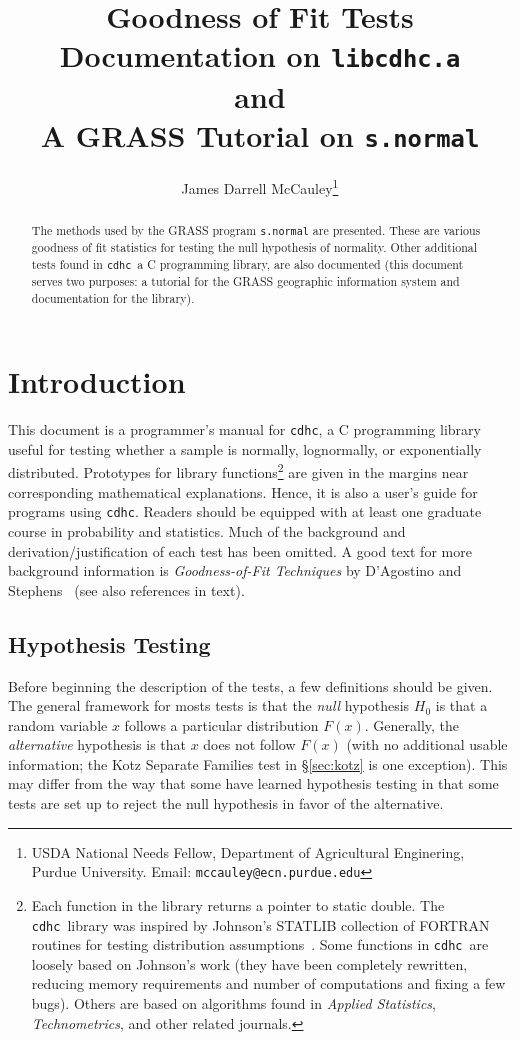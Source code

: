 \documentclass[draft]{article}
\title{Goodness of Fit Tests\\
{\large Documentation on {\tt libcdhc.a}}\\
{\large and}\\
{\large A GRASS Tutorial on {\tt s.normal}}}
\author{James Darrell McCauley\thanks{USDA National Needs Fellow,
Department of Agricultural Enginering, Purdue University. Email:
{\tt mccauley@ecn.purdue.edu}}}
\def\libname{{\tt cdhc}}
\begin{document}

\maketitle

\begin{abstract}
The methods used by the GRASS program {\tt s.normal}
are presented. These are various goodness of fit statistics for testing
the null hypothesis of normality. Other additional tests found in
\libname\, a C programming library,
are also documented (this document serves two purposes:
a tutorial for the GRASS geographic information system
and documentation for the library).
\end{abstract}

\section{Introduction}

This document is a programmer's
manual for \libname, a C programming library useful
for testing whether a sample is normally, lognormally,
or exponentially distributed.
Prototypes for library functions\footnote{%
Each function in the library returns a pointer to static double.
The \libname\ library was inspired by Johnson's
STATLIB collection of FORTRAN routines for testing
distribution assumptions~\protect\cite{johnson94}.
Some functions in \libname\
are loosely based on Johnson's work (they have been completely
rewritten, reducing memory requirements and number
of computations and fixing a few bugs). Others are based on
algorithms found in \emph{Applied Statistics}, \emph{Technometrics},
and other related journals.}
are given in the margins near
corresponding mathematical explanations. Hence, it is also
a user's guide for programs using \libname.
Readers should be equipped with at least one graduate course
in probability and statistics. Much of the background
and derivation/justification of each test has been
omitted. A good text for more background information
is {\em Goodness-of-Fit Techniques\/} by
D'Agostino and Stephens~\cite{dagostino86b} (see also references in text).

\subsection{Hypothesis Testing}

Before beginning the description of the tests, a few definitions
should be given. The general framework for mosts tests is that
the {\em null\/} hypothesis \(H_0\) is that a random variable \(x\)
follows a particular distribution \(F\left(x\right)\).
Generally, the {\em alternative\/} hypothesis is that
\(x\) does not follow \(F\left(x\right)\) (with no additional
usable information; the Kotz Separate Families test in \S\ref{sec:kotz}
is one exception).
This may differ from the way that some have learned hypothesis testing
in that some tests are set up to reject the null hypothesis in
favor of the alternative.
\end{document}
